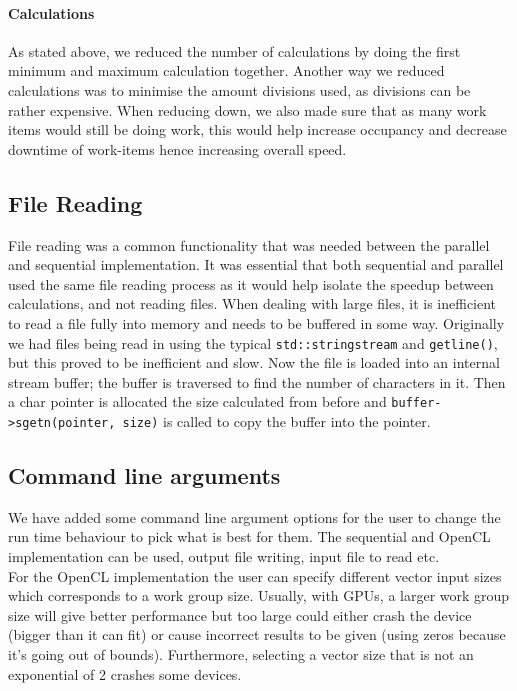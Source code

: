 \paragraph{Calculations}
As stated above, we reduced the number of calculations by doing the first minimum and maximum calculation together. Another way we reduced calculations was to minimise the amount divisions used, as divisions can be rather expensive. When reducing down, we also made sure that as many work items would still be doing work, this would help increase occupancy and decrease downtime of work-items hence increasing overall speed.

\subsection{File Reading}
File reading was a common functionality that was needed between the parallel and sequential implementation. It was essential that both sequential and parallel used the same file reading process as it would help isolate the speedup between calculations, and not reading files. When dealing with large files, it is inefficient to read a file fully into memory and needs to be buffered in some way. Originally we had files being read in using the typical \texttt{std::stringstream} and \texttt{getline()}, but this proved to be inefficient and slow. Now the file is loaded into an internal stream buffer; the buffer is traversed to find the number of characters in it. Then a char pointer is allocated the size calculated from before and \texttt{buffer->sgetn(pointer, size)} is called to copy the buffer into the pointer.

\subsection{Command line arguments}
We have added some command line argument options for the user to change the run time behaviour to pick what is best for them. The sequential and OpenCL implementation can be used, output file writing, input file to read etc.\\

For the OpenCL implementation the user can specify different vector input sizes which corresponds to a work group size. Usually, with GPUs, a larger work group size will give better performance but too large could either crash the device (bigger than it can fit) or cause incorrect results to be given (using zeros because it's going out of bounds). Furthermore, selecting a vector size that is not an exponential of 2 crashes some devices.
